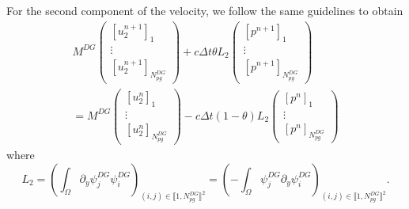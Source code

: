 \documentclass[a4paper, 11pt]{report}
\begin{document}
For the second component of the velocity, we follow the same guidelines to obtain 
\begin{multline*}
M^{DG}\begin{pmatrix}\left[u_2^{n+1}\right]_1\\ \vdots \\ \left[u_2^{n+1}\right]_{N_{pg}^{DG}}\end{pmatrix}+c\Delta t \theta L_2 \begin{pmatrix}\left[p^{n+1}\right]_1\\ \vdots \\ \left[p^{n+1}\right]_{N_{pg}^{DG}}\end{pmatrix}\\=M^{DG}\begin{pmatrix}\left[u_2^{n}\right]_1\\ \vdots \\ \left[u_2^{n}\right]_{N_{pg}^{DG}}\end{pmatrix}-c\Delta t (1-\theta) L_2 \begin{pmatrix}\left[p^{n}\right]_1\\ \vdots \\ \left[p^{n}\right]_{N_{pg}^{DG}}\end{pmatrix}
\end{multline*}
where
\begin{equation*}
L_2=\left(\int_{\Omega}\partial_y \psi^{DG}_j\psi^{DG}_i\right)_{{(i,j)\in\llbracket1,N_{pg}^{DG}\rrbracket^2}}=\left(-\int_{\Omega}\psi^{DG}_j\partial_y \psi^{DG}_i\right)_{{(i,j)\in\llbracket1,N_{pg}^{DG}\rrbracket^2}}.
\end{equation*}
\end{document}
